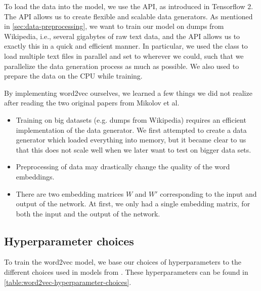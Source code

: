 To load the data into the model, we use the  API, as introduced in Tensorflow 2. The  API allows us to create flexible and scalable data generators. As mentioned in \cref{sec:data-preprocessing}, we want to train our model on dumps from Wikipedia, i.e., several gigabytes of raw text data, and the  API allows us to exactly this in a quick and efficient manner. In particular, we used the  class to load multiple text files in parallel and set  to  wherever we could, such that we parallelize the data generation process as much as possible. We also used  to prepare the data on the CPU while training.

By implementing word2vec ourselves, we learned a few things we did not realize after reading the two original papers from Mikolov et al. \cite{mikolov2013a, mikolov2013b}
\begin{itemize}
    \item Training on big datasets (e.g. dumps from Wikipedia) requires an efficient implementation of the data generator. We first attempted to create a data generator which loaded everything into memory, but it became clear to us that this does not scale well when we later want to test on bigger data sets.
    \item Preprocessing of data may drastically change the quality of the word embeddings.
    \item There are two embedding matrices $W$ and $W'$ corresponding to the input and output of the network. At first, we only had a single embedding matrix, for both the input and the output of the network.
\end{itemize}

\subsection{Hyperparameter choices}
\label{sec:hyperparameter-choices}
To train the word2vec model, we base our choices of hyperparameters to the different choices used in models from \cite{mikolov2013a, mikolov2013b}. These hyperparameters can be found in \cref{table:word2vec-hyperparameter-choices}.

